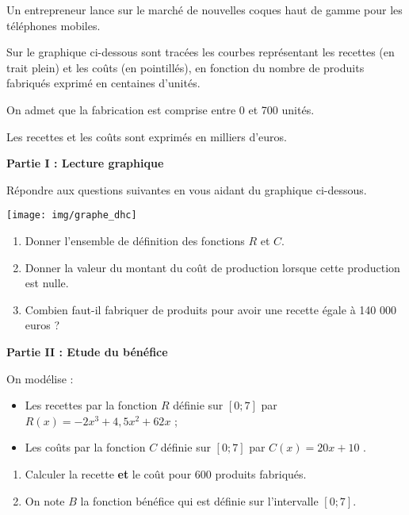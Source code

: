 \documentclass[a4paper]{article}
\begin{document}
    \medskip

    \begin{exerciceinterro}{}{}
      Un entrepreneur lance sur le marché de nouvelles coques haut de gamme pour les téléphones mobiles.
      
      Sur le graphique ci-dessous sont tracées les courbes représentant les recettes (en trait plein) et les coûts (en pointillés), en fonction du nombre de produits fabriqués exprimé en centaines d'unités.
      
      On admet que la fabrication est comprise entre 0 et 700 unités.
      
      Les recettes et les coûts sont exprimés en milliers d'euros.
      \vspace{3mm}
      
      {\bf Partie I : Lecture graphique}


      Répondre aux questions suivantes en vous aidant du graphique ci-dessous.
      
      \centerline{\texttt{[image: img/graphe\_dhc]}}

      \begin{enumerate}
        \item Donner l'ensemble de définition des fonctions $R$ et $C$.
        \item Donner la valeur du montant du coût de production lorsque cette production est nulle. 
        \item Combien faut-il fabriquer de produits pour avoir une recette égale à 140 000 euros ?
      \end{enumerate}
      
      {\bf Partie II : Etude du bénéfice}


      On modélise :
      \begin{itemize}
        \item Les recettes par la fonction $R$ définie sur $[0 ; 7]$ par $R(x) = -2x^3 + 4,5x^2 + 62x$ ;
        \item Les coûts par la fonction $C$ définie sur $[0 ; 7]$ par $C(x) = 20x + 10$ .
      \end{itemize}
      
      \begin{enumerate}
        \item Calculer la recette {\bf et} le coût pour 600 produits fabriqués.
        \item On note $B$ la fonction bénéfice qui est définie sur l'intervalle $[0 ; 7]$.
        

\end{enumerate}
\end{exerciceinterro}
\end{document}
